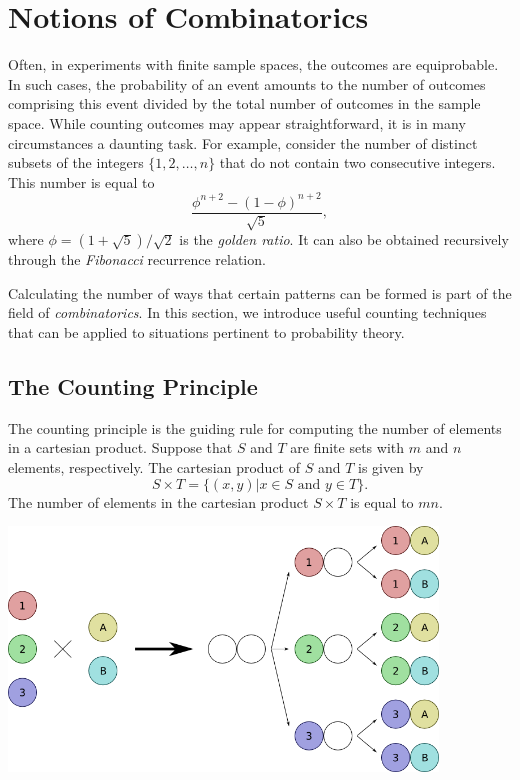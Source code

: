 \chapter{Notions of Combinatorics}

Often, in experiments with finite sample spaces, the outcomes are equiprobable.
In such cases, the probability of an event amounts to the number of outcomes comprising this event divided by the total number of outcomes in the sample space.
While counting outcomes may appear straightforward, it is in many circumstances a daunting task.
For example, consider the number of distinct subsets of the integers $\{ 1, 2, \ldots, n \}$ that do not contain two consecutive integers.
This number is equal to
\begin{equation*}
\frac{ \phi^{n+2} - (1 - \phi)^{n+2} }{ \sqrt{5} } ,
\end{equation*}
where $\phi = (1 + \sqrt{5}) / \sqrt{2}$ is the \emph{golden ratio}.
It can also be obtained recursively through the \emph{Fibonacci} recurrence relation.

Calculating the number of ways that certain patterns can be formed is part of the field of \emph{combinatorics}.
In this section, we introduce useful counting techniques that can be applied to situations pertinent to probability theory.


\section{The Counting Principle}

The counting principle is the guiding rule for computing the number of elements in a cartesian product.
Suppose that $S$ and $T$ are finite sets with $m$ and $n$ elements, respectively.
The cartesian product of $S$ and $T$ is given by
\begin{equation*}
S \times T = \{ (x, y) | x \in S \text{ and } y \in T \} .
\end{equation*}
The number of elements in the cartesian product $S \times T$ is equal to $m n$.

\begin{center}
\includegraphics[height=6.495cm]{Figures/4Chapter/countingprinciple}
\end{center}

